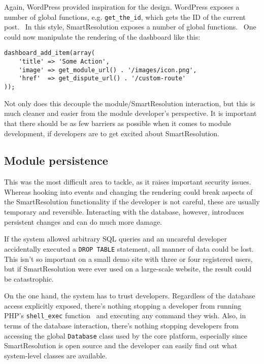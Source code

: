 Again, WordPress provided inspiration for the design. WordPress exposes a number of global functions, e.g. \lstinline{get_the_id}, which gets the ID of the current post.~\cite{wordpress:getTheId} In this style, SmartResolution exposes a number of global functions.~\cite{smartresolution:moduleDocs} One could now manipulate the rendering of the dashboard like this:

\begin{lstlisting}
dashboard_add_item(array(
    'title' => 'Some Action',
    'image' => get_module_url() . '/images/icon.png',
    'href'  => get_dispute_url() . '/custom-route'
));
\end{lstlisting}

Not only does this decouple the module/SmartResolution interaction, but this is much cleaner and easier from the module developer's perspective. It is important that there should be as few barriers as possible when it comes to module development, if developers are to get excited about SmartResolution.

\subsection{Module persistence}

This was the most difficult area to tackle, as it raises important security issues. Whereas hooking into events and changing the rendering could break aspects of the SmartResolution functionality if the developer is not careful, these are usually temporary and reversible. Interacting with the database, however, introduces persistent changes and can do much more damage.

If the system allowed arbitrary SQL queries and an uncareful developer accidentally executed a \lstinline{DROP TABLE} statement, all manner of data could be lost. This isn't so important on a small demo site with three or four registered users, but if SmartResolution were ever used on a large-scale website, the result could be catastrophic.

On the one hand, the system has to trust developers. Regardless of the database access explicitly exposed, there's nothing stopping a developer from running PHP's \lstinline{shell_exec} function~\cite{php:shellExec} and executing any command they wish. Also, in terms of the database interaction, there's nothing stopping developers from accessing the global \lstinline{Database} class used by the core platform, especially since SmartResolution is open source and the developer can easily find out what system-level classes are available.

